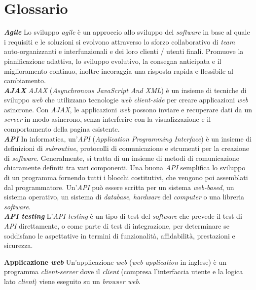 \chapter{Glossario} \label{gloss}

\textbf{\textit{Agile}} Lo sviluppo \textit{agile} è un approccio allo sviluppo del \textit{software} in base al quale i requisiti e le soluzioni si evolvono attraverso lo sforzo collaborativo di \textit{team} auto-organizzanti e interfunzionali e dei loro clienti / utenti finali. Promuove la pianificazione adattiva, lo sviluppo evolutivo, la consegna anticipata e il miglioramento continuo, inoltre incoraggia una risposta rapida e flessibile al cambiamento.\\

\textbf{\textit{AJAX}} \textit{AJAX} (\textit{Asynchronous JavaScript And XML}) è un insieme di tecniche di sviluppo \textit{web} che utilizzano tecnologie \textit{web} \textit{client-side} per creare applicazioni \textit{web} asincrone. Con \textit{AJAX}, le applicazioni \textit{web} possono inviare e recuperare dati da un \textit{server} in modo asincrono, senza interferire con la visualizzazione e il comportamento della pagina esistente.\\

\textbf{\textit{API}} In informatica, un'\textit{API} (\textit{Application Programming Interface}) è un insieme di definizioni di \textit{subroutine}, protocolli di comunicazione e strumenti per la creazione di \textit{software}. Generalmente, si tratta di un insieme di metodi di comunicazione chiaramente definiti tra vari componenti. Una buona \textit{API} semplifica lo sviluppo di un programma fornendo tutti i blocchi costitutivi, che vengono poi assemblati dal programmatore. Un'\textit{API} può essere scritta per un sistema \textit{web-based}, un sistema operativo, un sistema di \textit{database}, \textit{hardware} del \textit{computer} o una libreria \textit{software}.\\

\textbf{\textit{API testing}} L'\textit{API testing} è un tipo di test del \textit{software} che prevede il test di \textit{API} direttamente, o come parte di test di integrazione, per determinare se soddisfano le aspettative in termini di funzionalità, affidabilità, prestazioni e sicurezza.

\textbf{Applicazione \textit{web}} Un'applicazione \textit{web} (\textit{web application} in inglese) è un programma \textit{client-server} dove il \textit{client} (compresa l'interfaccia utente e la logica lato \textit{client}) viene eseguito su un \textit{browser web}.\\

